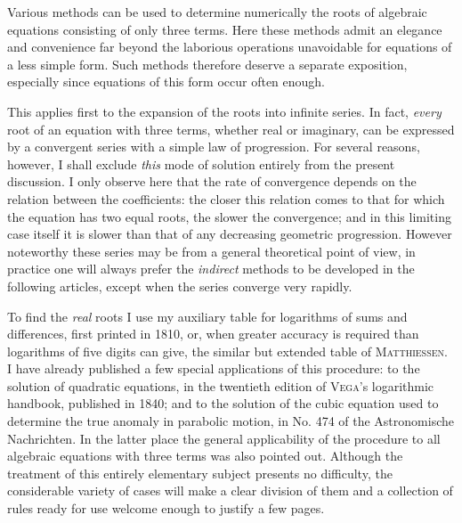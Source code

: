 Various methods can be used to determine numerically the roots of algebraic equations consisting of only three terms. Here these methods admit an elegance and convenience far beyond the laborious operations unavoidable for equations of a less simple form. Such methods therefore deserve a separate exposition, especially since equations of this form occur often enough.

This applies first to the expansion of the roots into infinite series. In fact, \textit{every} root of an equation with three terms, whether real or imaginary, can be expressed by a convergent series with a simple law of progression. For several reasons, however, I shall exclude \textit{this} mode of solution entirely from the present discussion. I only observe here that the rate of convergence depends on the relation between the coefficients: the closer this relation comes to that for which the equation has two equal roots, the slower the convergence; and in this limiting case itself it is slower than that of any decreasing geometric progression. However noteworthy these series may be from a general theoretical point of view, in practice one will always prefer the \textit{indirect} methods to be developed in the following articles, except when the series converge very rapidly.

To find the \textit{real} roots I use my auxiliary table for logarithms of sums and differences, first printed in 1810, or, when greater accuracy is required than logarithms of five digits can give, the similar but extended table of \textsc{Matthiessen}. I have already published a few special applications of this procedure: to the solution of quadratic equations, in the twentieth edition of \textsc{Vega}'s logarithmic handbook, published in 1840; and to the solution of the cubic equation used to determine the true anomaly in parabolic motion, in No. 474 of the Astronomische Nachrichten. In the latter place the general applicability of the procedure to all algebraic equations with three terms was also pointed out. Although the treatment of this entirely elementary subject presents no difficulty, the considerable variety of cases will make a clear division of them and a collection of rules ready for use welcome enough to justify a few pages.

